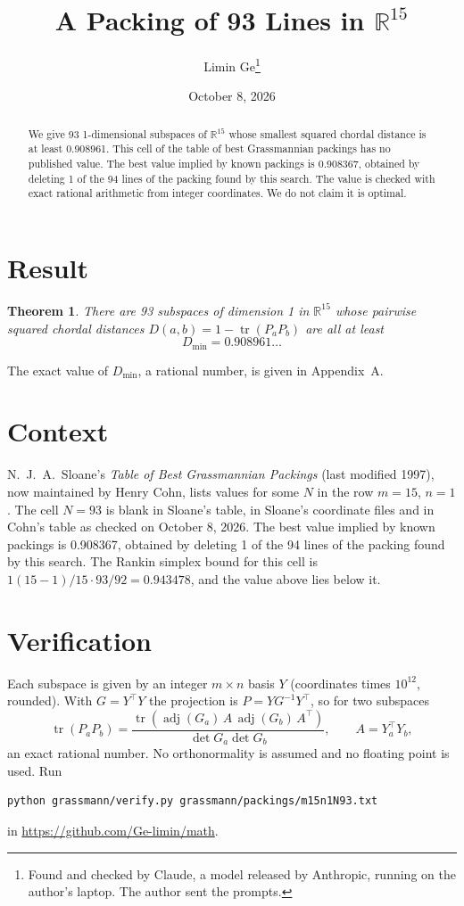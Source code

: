 \documentclass[11pt,a4paper]{article}
\title{A Packing of 93 Lines in $\mathbb{R}^{15}$}
\author{Limin Ge\thanks{Found and checked by Claude, a model released by Anthropic, running on the author's laptop. The author sent the prompts.}}
\date{October 8, 2026}
\newtheorem*{theorem}{Theorem}
\begin{document}
\maketitle
\begin{abstract}
We give 93 1-dimensional subspaces of $\mathbb{R}^{15}$ whose smallest squared chordal distance is at least 0.908961. This cell of the table of best Grassmannian packings has no published value. The best value implied by known packings is 0.908367, obtained by deleting 1 of the 94 lines of the packing found by this search. The value is checked with exact rational arithmetic from integer coordinates. We do not claim it is optimal.
\end{abstract}

\section{Result}
\begin{theorem}
There are 93 subspaces of dimension 1 in $\mathbb{R}^{15}$ whose pairwise squared chordal distances $D(a,b) = 1 - \operatorname{tr}(P_aP_b)$ are all at least
\[ D_{\min} = 0.908961\ldots \]
\end{theorem}
The exact value of $D_{\min}$, a rational number, is given in Appendix~A.


\section{Context}
N.~J.~A.~Sloane's \emph{Table of Best Grassmannian Packings} (last modified 1997), now maintained by Henry Cohn, lists values for some $N$ in the row $m=15$, $n=1$. The cell $N=93$ is blank in Sloane's table, in Sloane's coordinate files and in Cohn's table as checked on October 8, 2026. The best value implied by known packings is 0.908367, obtained by deleting 1 of the 94 lines of the packing found by this search. The Rankin simplex bound for this cell is $1(15-1)/15\cdot 93/92 = 0.943478$, and the value above lies below it.


\section{Verification}
Each subspace is given by an integer $m\times n$ basis $Y$ (coordinates times $10^{12}$, rounded). With $G=Y^\top Y$ the projection is $P=YG^{-1}Y^\top$, so for two subspaces
\[ \operatorname{tr}(P_aP_b)=\frac{\operatorname{tr}(\operatorname{adj}(G_a)\,A\,\operatorname{adj}(G_b)\,A^\top)}{\det G_a\det G_b},\qquad A=Y_a^\top Y_b, \]
an exact rational number. No orthonormality is assumed and no floating point is used. Run
\begin{verbatim}
python grassmann/verify.py grassmann/packings/m15n1N93.txt
\end{verbatim}
in \url{https://github.com/Ge-limin/math}.
\end{document}
